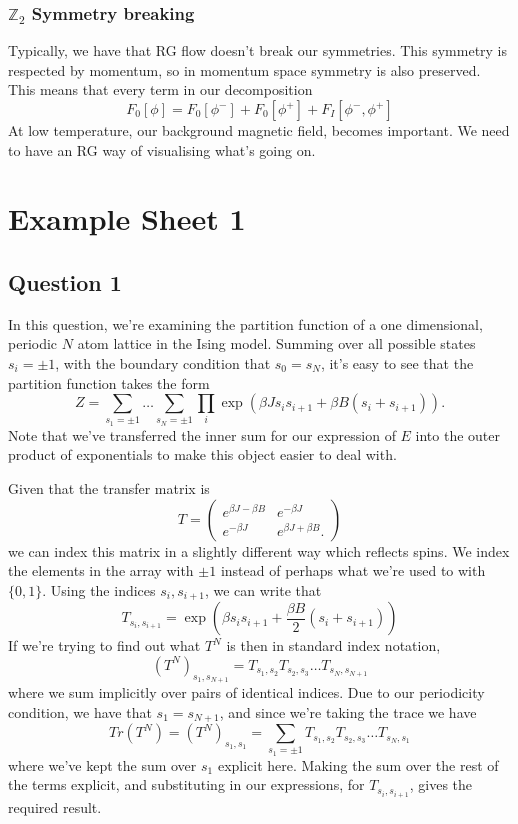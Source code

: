 \documentclass[11pt, oneside]{article}   	%
\begin{document}
\subsubsection{$ \mathbb{ Z} _ 2 $ Symmetry breaking } 
Typically, we have that RG flow doesn't break our 
symmetries. This symmetry is respected by momentum, 
so in momentum space symmetry is also preserved. This means 
that every term in our decomposition 
\[
 F_ 0 [ \phi ] = F_ 0 [ \phi ^ - ]  + F_0 [ \phi ^ + ] + F_I [ \phi ^ - , \phi ^ + ] 
\] At low temperature, 
our background magnetic field, becomes important. 
We need to have an RG way of visualising what's going on. 


\pagebreak 
\section{Example Sheet 1} 
\subsection{Question 1}
In this question, we're examining the partition function of a one dimensional, periodic $N$ atom lattice in the Ising model. 
Summing over all possible states $s_i = \pm 1$, with the boundary condition that $s_0 = s_N$, it's easy to see that the partition function takes the form 
\[ 
	Z = \sum_{s_1 = \pm 1} \dots \sum_{s_N = \pm 1} \prod_{i} \exp\left( \beta J s_i s_{i + 1} + \beta B (s_i + s_{i + 1}) \right). 
\]
Note that we've transferred the inner sum for our expression of $E$ into the outer product of exponentials to make this object easier to deal with. 

Given that the transfer matrix is 
\[ 
	T= \begin{pmatrix}
		e^{\beta J  - \beta B} & e^{ - \beta J} \\
		e^{ - \beta J} & e^{\beta J + \beta B}. 
	\end{pmatrix}
\]
we can index this matrix in a slightly different way which reflects spins. We index the elements in the array with ${\pm 1}$ instead of perhaps what we're used to with $\{ 0, 1\} $. Using the indices $s_i, s_{i + 1}$, we can write that 
\[ 
	T_{s_i, s_{i + 1}} = \exp \left (\beta s_{i} s_{i + 1} + \frac{\beta B}{2} (s_i + s_{i + 1}) \right) 
 \] 
 If we're trying to find out what $T^N$ is then in standard index notation, 
 \[ 
 	\left(  T^N \right)_{s_{1}, s_{N + 1}}= T_{s_1, s_2} T_{s_2, s_{3}} \dots T_{s_N, s_{N + 1}}
 \] 
 where we sum implicitly over pairs of identical indices. 
 Due to our periodicity condition, we have that $s_1= s_{N + 1}$, and since we're taking the trace we have 
 \[ 
 	Tr (T^N) = \left( T^N \right)_{s_1, s_1} = \sum_{s_1 = \pm 1} T_{s_1, s_2} T_{s_2, s_{3}} \dots T_{s_N, s_{1}}
 \] 
where we've kept the sum over $s_1$ explicit here. Making the sum over the rest of the terms explicit, and substituting in our expressions, for $T_{s_i, s_{i + 1}}$, gives the required result. 
\end{document}
